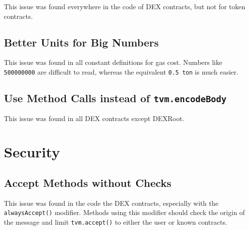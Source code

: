 
This issue was found everywhere in the code of DEX contracts, but not
for token contracts.

\subsection{Better Units for Big Numbers}
\label{readability:numbers}


This issue was found in all constant definitions for gas cost.
Numbers like {\tt 500000000} are difficult to read, whereas the
equivalent {\tt 0.5 ton} is much easier.

\subsection{Use Method Calls instead of {\tt tvm.encodeBody}}
\label{readability:call}


This issue was found in all DEX contracts except DEXRoot.

\section{Security}

\subsection{Accept Methods without Checks}
\label{accept:all}


This issue was found in the code the DEX contracts, especially with
the {\tt alwaysAccept()} modifier. Methods using this modifier should
check the origin of the message and limit {\tt tvm.accept()} to either
the user or known contracts.

